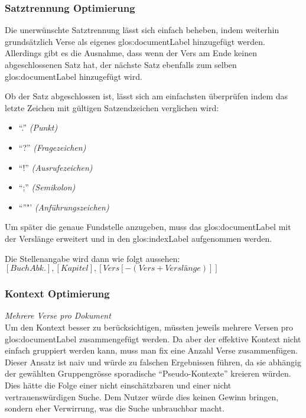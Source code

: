 \subsubsection{Satztrennung Optimierung}
Die unerwünschte Satztrennung lässt sich einfach beheben, indem weiterhin grundsätzlich Verse als eigenes \gls{glos:documentLabel} hinzugefügt werden.
Allerdings gibt es die Ausnahme, dass wenn der Vers am Ende keinen abgeschlossenen Satz hat, der nächste Satz ebenfalls zum selben \gls{glos:documentLabel} hinzugefügt wird.

Ob der Satz abgeschlossen ist, lässt sich am einfachsten überprüfen indem das letzte Zeichen mit gültigen Satzendzeichen verglichen wird:
\begin{itemize}
	\item "`."' \textit{(Punkt)}
	\item "`?"' \textit{(Fragezeichen)}
	\item "`!"' \textit{(Ausrufezeichen)}
	\item "`;"' \textit{(Semikolon)}
	\item "`"'"' \textit{(Anführungszeichen)}
\end{itemize}

Um später die genaue Fundstelle anzugeben, muss das \gls{glos:documentLabel} mit der Verslänge erweitert und in den \gls{glos:indexLabel} aufgenommen werden.

Die Stellenangabe wird dann wie folgt aussehen:\\
$[Buch Abk.], [Kapitel],[Vers[-(Vers + Verslänge)]]$

\subsubsection{Kontext Optimierung}
\label{sec:contextOptimaze}
\textit{Mehrere Verse pro Dokument}
\vspace{0.5em}\\
Um den Kontext besser zu berücksichtigen, müssten jeweils mehrere Versen pro \gls{glos:documentLabel} zusammengefügt werden.
Da aber der effektive Kontext nicht einfach gruppiert werden kann, muss man fix eine Anzahl Verse zusammenfügen.
Dieser Ansatz ist naiv und würde zu falschen Ergebnissen führen, da sie abhängig der gewählten Gruppengrösse sporadische "`Pseudo-Kontexte"' kreieren würden.
Dies hätte die Folge einer nicht einschätzbaren und einer nicht vertrauenswürdigen Suche.
Dem Nutzer würde dies keinen Gewinn bringen, sondern eher Verwirrung, was die Suche unbrauchbar macht.

